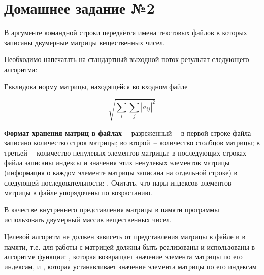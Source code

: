 \section*{Домашнее задание №2}

В аргументе командной строки передаётся имена текстовых файлов
в которых записаны двумерные матрицы
вещественных чисел.

Необходимо напечатать на стандартный выходной
поток результат следующего алгоритма:

Евклидова норму матрицы, находящейся во входном файле

$$
\sqrt{ \sum_i\sum_j{|a_{ij}|^2} }
$$

\textbf{Формат хранения матриц в файлах}~--
разреженный~-- в первой строке файла записано количество строк
матрицы; во второй~-- количество столбцов матрицы; в третьей~--
количество ненулевых элементов матрицы; в последующих строках
файла записаны индексы и значения этих ненулевых элементов
матрицы (информация о каждом элементе матрицы записана на
отдельной строке) в следующей последовательности: 
 . Считать, что пары индексов
элементов матрицы в файле упорядочены по возрастанию.

В качестве внутреннего представления матрицы в памяти программы
использовать двумерный массив вещественных чисел.

Целевой алгоритм не
должен зависеть от представления матрицы в файле и в памяти, т.е. для
работы с матрицей должны быть реализованы и использованы в алгоритме
функции: , которая возвращает
значение элемента матрицы по его индексам, и , которая устанавливает значение элемента
матрицы по его индексам
